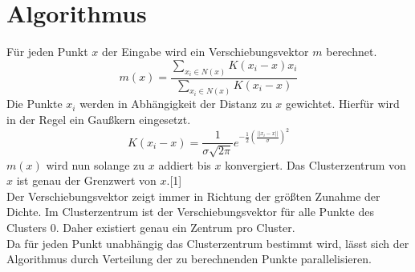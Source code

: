 \section{Algorithmus}
	Für jeden Punkt $ x $ der Eingabe wird ein Verschiebungsvektor $ m $ berechnet. 
		\[ m(x) = \frac{\sum_{x_i \in N(x)} K(x_i - x) x_i }{\sum_{x_i \in N(x)} K(x_i - x)} \]
	Die Punkte $ x_i $ werden in Abhängigkeit der Distanz zu $ x $ gewichtet. Hierfür wird in der Regel ein Gaußkern eingesetzt.
		\[K(x_i - x) = \frac {1}{\sigma\sqrt{2\pi}} e^{-\frac {1}{2} \left(\frac{||x_i - x||}{\sigma}\right)^2}\]
	$ m(x) $ wird nun solange zu $ x $ addiert bis $ x $ konvergiert. Das Clusterzentrum von $ x $ ist genau der Grenzwert von $ x $.[1]\\
	Der Verschiebungsvektor zeigt immer in Richtung der größten Zunahme der Dichte. Im Clusterzentrum ist der Verschiebungsvektor für alle Punkte des Clusters 0.
	Daher existiert genau ein Zentrum pro Cluster.\\
	Da für jeden Punkt unabhängig das Clusterzentrum bestimmt wird, lässt sich der Algorithmus durch Verteilung der zu berechnenden Punkte parallelisieren.\\

